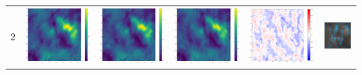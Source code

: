 \documentclass[landscape,paperwidth=46truein,paperheight=41truein,fontscale=0.3]{baposter}
\begin{document}
\begin{poster}
{\begin{center}
\begin{minipage}{0.97 \columnwidth}
\begin{multicols}{2}
{\begin{tabular}{c c c c c c }
					2 &
					\includegraphics[width=0.185\linewidth]{../../../../src/python/minnd/movies/ar2/intensity/minus/fig_00} &
					\includegraphics[width=0.185\linewidth]{../../../../src/python/minnd/movies/ar2/intensity/zero/fig_00} &
					\includegraphics[width=0.185\linewidth]{../../../../src/python/minnd/movies/ar2/intensity/plus/fig_00} &
					\includegraphics[width=0.185\linewidth]{../../../../src/python/minnd/movies/ar2/velocity/zero-ave/fig_00} &
					\includegraphics[width=0.185\linewidth]{../../../../src/python/minnd/movies/ar2/intensity-velocity/zero-ave/fig_00} \\
					
%					
					

\end{tabular}}
\end{multicols}
\end{minipage}
\end{center}}
\end{poster}
\end{document}
